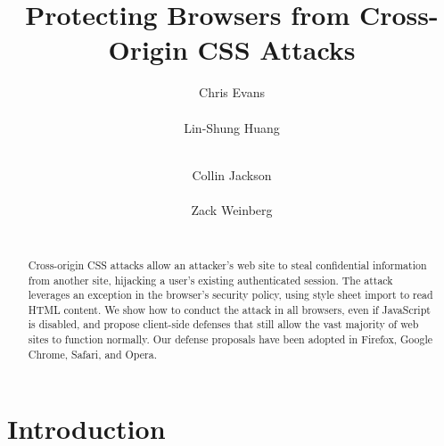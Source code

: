 \documentclass{acm_proc_article-sp}
\begin{document}
\title{Protecting Browsers from Cross-Origin CSS Attacks}
\author{
\alignauthor
Chris Evans\\
      \\
\alignauthor
Lin-Shung Huang\\
      \\
\and
\alignauthor
Collin Jackson\\
      \\
\alignauthor
Zack Weinberg\\
      \\
}

\newcommand{\todo}[1]{\textbf{[TODO: #1]}}

\maketitle
\begin{abstract}
Cross-origin CSS attacks allow an attacker's web site to steal confidential information from another site, hijacking a user's existing authenticated session. The attack leverages an exception in the browser's security policy,
using style sheet import to read HTML content. We show how to conduct the attack in all browsers, even if JavaScript is disabled, and propose client-side defenses that still allow the vast majority of web sites to function normally. Our defense proposals have been adopted in Firefox, Google Chrome, Safari, and Opera.
\end{abstract}




\section{Introduction}
\end{document}
